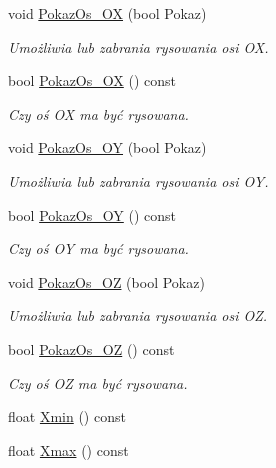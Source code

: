 \begin{DoxyCompactItemize}
\item 
void \hyperlink{class_pz_g_1_1_lacze_do_g_n_u_plota_a11421d7c67deab6b7524cc492407e897}{Pokaz\+Os\+\_\+\+O\+X} (bool Pokaz)
\begin{DoxyCompactList}\small\item\em Umożliwia lub zabrania rysowania osi O\+X. \end{DoxyCompactList}\item 
bool \hyperlink{class_pz_g_1_1_lacze_do_g_n_u_plota_a14cafd721032bd57c312759898871ed4}{Pokaz\+Os\+\_\+\+O\+X} () const 
\begin{DoxyCompactList}\small\item\em Czy oś O\+X ma być rysowana. \end{DoxyCompactList}\item 
void \hyperlink{class_pz_g_1_1_lacze_do_g_n_u_plota_a7c3db909b266fc30808e86406c04b516}{Pokaz\+Os\+\_\+\+O\+Y} (bool Pokaz)
\begin{DoxyCompactList}\small\item\em Umożliwia lub zabrania rysowania osi O\+Y. \end{DoxyCompactList}\item 
bool \hyperlink{class_pz_g_1_1_lacze_do_g_n_u_plota_a62937224f01b1dacba3c3ed5f516d208}{Pokaz\+Os\+\_\+\+O\+Y} () const 
\begin{DoxyCompactList}\small\item\em Czy oś O\+Y ma być rysowana. \end{DoxyCompactList}\item 
void \hyperlink{class_pz_g_1_1_lacze_do_g_n_u_plota_a9fabfe88cb1801a5de8923f45f514b99}{Pokaz\+Os\+\_\+\+O\+Z} (bool Pokaz)
\begin{DoxyCompactList}\small\item\em Umożliwia lub zabrania rysowania osi O\+Z. \end{DoxyCompactList}\item 
bool \hyperlink{class_pz_g_1_1_lacze_do_g_n_u_plota_a1fed67d4ce58ae40be9c325fb385d5ed}{Pokaz\+Os\+\_\+\+O\+Z} () const 
\begin{DoxyCompactList}\small\item\em Czy oś O\+Z ma być rysowana. \end{DoxyCompactList}\item 
float \hyperlink{class_pz_g_1_1_lacze_do_g_n_u_plota_a9ed40b6da931387f74de9a16470515dd}{Xmin} () const 
\item 
float \hyperlink{class_pz_g_1_1_lacze_do_g_n_u_plota_a71944bf0e24114edae41e76c5edf0758}{Xmax} () const 

\end{DoxyCompactItemize}
